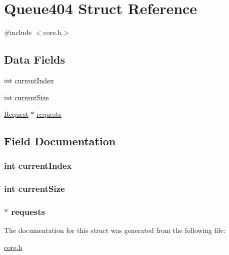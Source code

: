 \hypertarget{struct_queue404}{\section{Queue404 Struct Reference}
\label{struct_queue404}
}


{\ttfamily \#include $<$core.\-h$>$}

\subsection*{Data Fields}
\begin{DoxyCompactItemize}
\item 
int \hyperlink{struct_queue404_a8b41910066b877c9effd739880b6b15e}{current\-Index}
\item 
int \hyperlink{struct_queue404_a0c2f9a0a6941e32677f17cadd8626c6f}{current\-Size}
\item 
\hyperlink{struct_request}{Request} $\ast$ \hyperlink{struct_queue404_a9eaf7c28985896889d16ff7e5b43da32}{requests}
\end{DoxyCompactItemize}


\subsection{Field Documentation}
\hypertarget{struct_queue404_a8b41910066b877c9effd739880b6b15e}{
\subsubsection[{current\-Index}]{\setlength{\rightskip}{0pt plus 5cm}int current\-Index}}\label{struct_queue404_a8b41910066b877c9effd739880b6b15e}
\hypertarget{struct_queue404_a0c2f9a0a6941e32677f17cadd8626c6f}{
\subsubsection[{current\-Size}]{\setlength{\rightskip}{0pt plus 5cm}int current\-Size}}\label{struct_queue404_a0c2f9a0a6941e32677f17cadd8626c6f}
\hypertarget{struct_queue404_a9eaf7c28985896889d16ff7e5b43da32}{
\subsubsection[{requests}]{$\ast$ requests}}\label{struct_queue404_a9eaf7c28985896889d16ff7e5b43da32}


The documentation for this struct was generated from the following file\-:\begin{DoxyCompactItemize}
\item 
\hyperlink{core_8h}{core.\-h}\end{DoxyCompactItemize}
